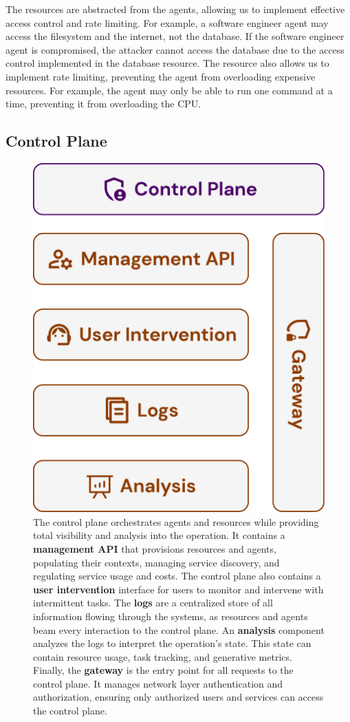 \documentclass[a4paper,twocolumn,11pt]{quantumarticle}
\begin{document}
The resources are abstracted from the agents, allowing us to implement effective access control and rate limiting. For example, a software engineer agent may access the filesystem and the internet, not the database. If the software engineer agent is compromised, the attacker cannot access the database due to the access control implemented in the database resource. The resource also allows us to implement rate limiting, preventing the agent from overloading expensive resources. For example, the agent may only be able to run one command at a time, preventing it from overloading the CPU.

\subsection{Control Plane}
\begin{figure}[t]
  \includegraphics[width=\columnwidth]{figures/control_plane.pdf}
  \caption{The control plane orchestrates agents and resources while providing total visibility and analysis into the operation. It contains a \textbf{management API} that provisions resources and agents, populating their contexts, managing service discovery, and regulating service usage and costs. The control plane also contains a \textbf{user intervention} interface for users to monitor and intervene with intermittent tasks. The \textbf{logs} are a centralized store of all information flowing through the systems, as resources and agents beam every interaction to the control plane. An \textbf{analysis} component analyzes the logs to interpret the operation's state. This state can contain resource usage, task tracking, and generative metrics. Finally, the \textbf{gateway} is the entry point for all requests to the control plane. It manages network layer authentication and authorization, ensuring only authorized users and services can access the control plane.}

\end{figure}
\end{document}
